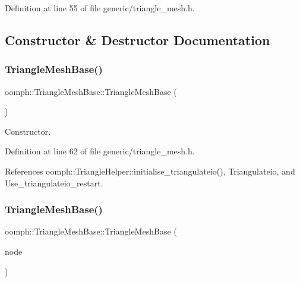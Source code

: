 Definition at line 55 of file generic/triangle\+\_\+mesh.\+h.



\subsection{Constructor \& Destructor Documentation}
\mbox{\label{classoomph_1_1TriangleMeshBase_afdfa2e68988d225301a9a262883ddf62}} 
\subsubsection{\texorpdfstring{Triangle\+Mesh\+Base()}{TriangleMeshBase()}\hspace{0.1cm}{\footnotesize\ttfamily [1/2]}}
{\footnotesize\ttfamily oomph\+::\+Triangle\+Mesh\+Base\+::\+Triangle\+Mesh\+Base (\begin{DoxyParamCaption}{ }\end{DoxyParamCaption})\hspace{0.3cm}{\ttfamily [inline]}}



Constructor. 



Definition at line 62 of file generic/triangle\+\_\+mesh.\+h.



References oomph\+::\+Triangle\+Helper\+::initialise\+\_\+triangulateio(), Triangulateio, and Use\+\_\+triangulateio\+\_\+restart.

\mbox{\label{classoomph_1_1TriangleMeshBase_a598613709db807336487fbe2657e905e}} 
\subsubsection{\texorpdfstring{Triangle\+Mesh\+Base()}{TriangleMeshBase()}\hspace{0.1cm}{\footnotesize\ttfamily [2/2]}}
{\footnotesize\ttfamily oomph\+::\+Triangle\+Mesh\+Base\+::\+Triangle\+Mesh\+Base (\begin{DoxyParamCaption}\item[{const \hyperlink{classoomph_1_1TriangleMeshBase}{Triangle\+Mesh\+Base} \&}]{node }\end{DoxyParamCaption})\hspace{0.3cm}{\ttfamily [inline]}}



